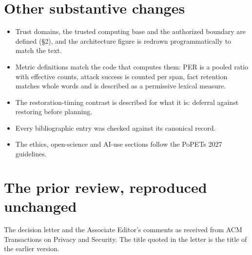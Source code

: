 \documentclass[10pt]{article}
\begin{document}
\section*{Other substantive changes}
\begin{itemize}
\item Trust domains, the trusted computing base and the authorized boundary are defined (\S2), and the
  architecture figure is redrawn programmatically to match the text.
\item Metric definitions match the code that computes them: PER is a pooled ratio with effective counts, attack
  success is counted per span, fact retention matches whole words and is described as a permissive lexical
  measure.
\item The restoration-timing contrast is described for what it is: deferral against restoring before planning.
\item Every bibliographic entry was checked against its canonical record.
\item The ethics, open-science and AI-use sections follow the PoPETs 2027 guidelines.
\end{itemize}


\clearpage
\section*{The prior review, reproduced unchanged}
The decision letter and the Associate Editor's comments as received from ACM Transactions on Privacy and Security.
The title quoted in the letter is the title of the earlier version.

\lstset{basicstyle=\small\ttfamily, breaklines=true, columns=fullflexible, keepspaces=true, frame=single}

\end{document}
